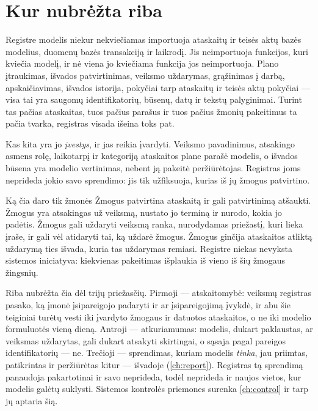 \section{Kur nubrėžta riba}\label{sec:register:line}

\begin{codebox}{Registre modelis niekur nekviečiamas}
 importuoja ataskaitų ir teisės aktų bazės modelius, duomenų bazės
transakciją ir laikrodį. Jis neimportuoja funkcijos, kuri kviečia modelį, ir nė viena jo kviečiama
funkcija jos neimportuoja. Plano įtraukimas, išvados patvirtinimas, veiksmo uždarymas, grąžinimas į darbą,
 apskaičiavimas, išvados istorija, pokyčiai tarp ataskaitų ir teisės aktų pokyčiai ---
visa tai yra saugomų identifikatorių, būsenų, datų ir tekstų palyginimai. Turint tas pačias
ataskaitas, tuos pačius parašus ir tuos pačius žmonių pakeitimus ta pačia tvarka, registras
visada išeina toks pat.

\smallskip
Kas kita yra jo \emph{įvestys}, ir jas reikia įvardyti. Veiksmo pavadinimus, atsakingo asmens
rolę, laikotarpį ir kategoriją ataskaitos plane parašė modelis, o išvados būsena yra modelio
vertinimas, nebent ją pakeitė peržiūrėtojas. Registras joms neprideda jokio savo sprendimo: jis
tik užfiksuoja, kurias iš jų žmogus patvirtino.
\end{codebox}

\begin{humanbox}{Ką čia daro tik žmonės}
Žmogus patvirtina ataskaitą ir gali patvirtinimą atšaukti. Žmogus yra atsakingas už veiksmą,
nustato jo terminą ir nurodo, kokia jo padėtis. Žmogus gali uždaryti veiksmą ranka, nurodydamas
priežastį, kuri lieka įraše, ir gali vėl atidaryti tai, ką uždarė žmogus. Žmogus ginčija
ataskaitos atliktą uždarymą ties išvada, kuria tas uždarymas remiasi. Registre niekas nevyksta
sistemos iniciatyva: kiekvienas pakeitimas išplaukia iš vieno iš šių žmogaus žingsnių.
\end{humanbox}

Riba nubrėžta čia dėl trijų priežasčių. Pirmoji --- atskaitomybė: veiksmų registras pasako, ką
įmonė įsipareigojo padaryti ir ar įsipareigojimą įvykdė, ir abu šie teiginiai turėtų vesti iki
įvardyto žmogaus ir datuotos ataskaitos, o ne iki modelio formuluotės vieną dieną. Antroji ---
atkuriamumas: modelis, dukart paklaustas, ar veiksmas uždarytas, gali dukart atsakyti skirtingai,
o sąsaja pagal pareigos identifikatorių --- ne. Trečioji --- sprendimas, kuriam modelis
\emph{tinka}, jau priimtas, patikrintas ir peržiūrėtas kitur --- išvadoje (\cref{ch:report}).
Registras tą sprendimą panaudoja pakartotinai ir savo neprideda, todėl neprideda ir naujos
vietos, kur modelis galėtų suklysti. Sistemos kontrolės priemones surenka \cref{ch:control} ir
tarp jų aptaria šią.


